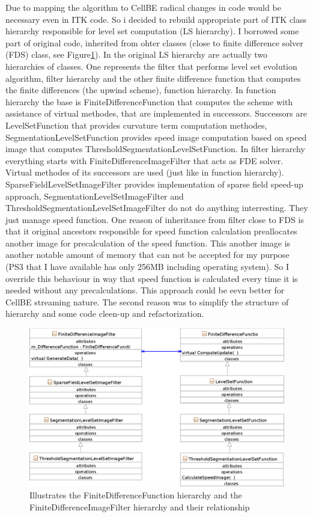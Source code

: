 Due to mapping the algorithm to CellBE radical changes in code would be necessary even in ITK code. So i decided to rebuild appropriate part of ITK class hierarchy responsible for level set computation (LS hierarchy). I borrowed some part of original code, inherited from ohter classes (close to finite difference solver (FDS) class, see Figure\ref{fg:originalHierarchy}). In the original LS hierarchy are actually two hierarchies of classes. One represents the filter that performs level set evolution algorithm, filter hierarchy and the other finite difference function that computes the finite differences (the upwind scheme), function hierarchy. In function hierarchy the base is FiniteDifferenceFunction that computes the scheme with assistance of virtual methodes, that are implemented in successors. Successors are LevelSetFunction that provides curvature term computation methodes, SegmentationLevelSetFunction provides speed image computation based on speed image that computes ThresholdSegmentationLevelSetFunction. In filter hierarchy everything starts with FiniteDifferenceImageFilter that acts as FDE solver. Virtual methodes of its successors are used (just like in function hierarchy). SparseFieldLevelSetImageFilter provides implementation of sparse field speed-up approach, SegmentationLevelSetImageFilter and ThresholdSegmentationLevelSetImageFilter do not do anything interresting. They just manage speed function.
One reason of inheritance from filter close to FDS is that it original ancestors responsible for speed function calculation preallocates another image for precalculation of the speed function. This another image is another notable amount of memory that can not be accepted for my purpose (PS3 that I have available has only 256MB including operating system). So I override this behaviour in way that speed function is calculated every time it is needed without any precalculations. This approach could be eevn better for CellBE streaming nature. The second reason was to simplify the structure of hierarchy and some code cleen-up and refactorization.

\begin{figure}
    \centering
    \includegraphics[width=15cm]{data/originalHierarchy.eps}
    \caption[Original ITK thresholding level set filter class hierarchy]{Illustrates the FiniteDifferenceFunction hierarchy and the FiniteDifferenceImageFilter hierarchy and their relationship}
    \label{fg:originalHierarchy}
\end{figure}

